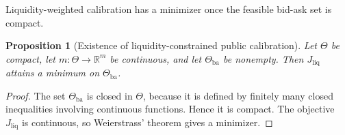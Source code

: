 \documentclass[11pt,a4paper]{amsart}
\theoremstyle{plain}
\newtheorem{proposition}[theorem]{Proposition}
\theoremstyle{definition}
\theoremstyle{remark}
\newcommand{\R}{\mathbb{R}}
\begin{document}
Liquidity-weighted calibration has a minimizer once the feasible bid-ask set is compact.

\begin{proposition}[Existence of liquidity-constrained public calibration]\label{prop:liquidity-existence}
Let \(\Theta\) be compact, let \(m:\Theta\to\R^m\) be continuous, and let
\(\Theta_{\mathrm{ba}}\) be nonempty.  Then \(J_{\mathrm{liq}}\) attains a minimum on
\(\Theta_{\mathrm{ba}}\).
\end{proposition}

\begin{proof}
The set \(\Theta_{\mathrm{ba}}\) is closed in \(\Theta\), because it is defined by finitely many
closed inequalities involving continuous functions.  Hence it is compact.  The objective
\(J_{\mathrm{liq}}\) is continuous, so Weierstrass' theorem gives a minimizer.
\end{proof}



\end{document}
